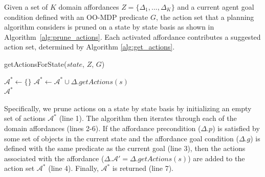 \documentclass[letterpaper]{article}
\begin{document}
Given a set of $K$ domain affordances $Z = \{\Delta_1, ..., \Delta_K\}$ and a current 
agent goal condition defined with an OO-MDP predicate $G$, the action set that a 
planning algorithm considers is pruned on a state by state basis as shown in 
Algorithm~\ref{alg:prune_actions}.  Each 
activated affordance contributes a suggested action set, determined by Algorithm \ref{alg:get_actions}. 

\begin{algorithm}
  \caption{getActionsForState($state$, $Z$, $G$)}
  \begin{algorithmic}[1]
    \State $\mathcal{A}^* \leftarrow \{\}$
    \State $\mathcal{A}^* \leftarrow \mathcal{A}^* \cup \Delta.getActions(s)$
    \EndIf
    \EndFor \\
    \Return $\mathcal{A}^*$
  \end{algorithmic}
  \label{alg:prune_actions}
\end{algorithm}

Specifically, we prune actions on a state by state basis
by initializing an empty set of actions $\mathcal{A}^*$ (line 1). The algorithm then iterates
through each of the domain affordances (lines 2-6). If the affordance
precondition ($\Delta.p$) is satisfied by some set of objects in the current state
and the affordance goal condition ($\Delta.g$) is defined with the same predicate
as the current goal (line 3), then the actions associated with the affordance ($\Delta.\mathcal{A}' = \Delta.getActions(s)$) are added to the action set $\mathcal{A}^*$ (line 4). Finally, $\mathcal{A}^*$ is returned (line 7).
\end{document}
